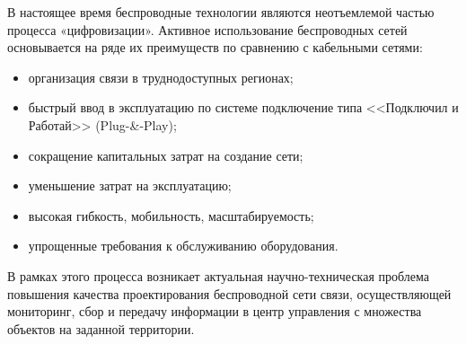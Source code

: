  

В настоящее время беспроводные технологии являются неотъемлемой частью процесса «цифровизации». Активное использование беспроводных сетей основывается на ряде их преимуществ по сравнению с кабельными сетями:
\begin{itemize}
    \item организация связи в труднодоступных регионах;
    \item быстрый ввод в эксплуатацию по системе подключение типа <<Подключил и Работай>> (Plug-\&-Play);
    \item сокращение капитальных затрат на создание сети; 
    \item уменьшение затрат на эксплуатацию;
    \item высокая гибкость, мобильность, масштабируемость;
    \item упрощенные требования к обслуживанию оборудования.
\end{itemize}

В рамках этого процесса возникает актуальная научно-техническая проблема повышения качества проектирования беспроводной сети связи, осуществляющей мониторинг, сбор и передачу информации в центр управления с множества объектов на заданной территории.   





